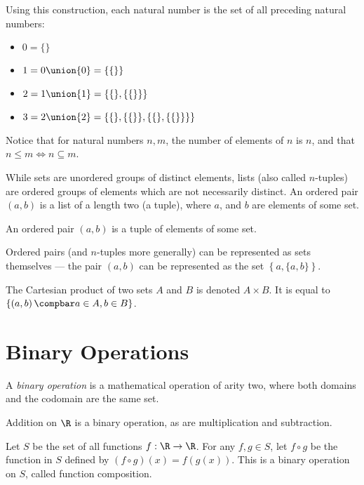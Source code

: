 \documentclass[12pt]{article}
\begin{document}
Using this construction, each natural number is the set of all preceding natural numbers:
\begin{itemize}
    \item $0 = \{\}$
    \item $1 = 0 \union \{0\} = \{\{\}\}$
    \item $2 = 1 \union \{1\} = \{\{\}, \{\{\}\}\}$
    \item $3 = 2 \union \{2\} = \{\{\}, \{\{\}\}, \{\{\}, \{\{\}\}\}\}$
\end{itemize}

Notice that for natural numbers $n, m$, the number of elements of $n$ is $n$, and that $n \leq m \iff n \subseteq m$.

While sets are unordered groups of distinct elements, lists (also called $n$-tuples) are ordered groups of elements which are not necessarily distinct. An ordered pair $(a, b)$ is a list of a length two (a tuple), where $a$, and $b$ are elements of some set.

\begin{defn}\label{tuple}
    An ordered pair $(a, b)$ is a tuple of elements of some set.
\end{defn}

Ordered pairs (and $n$-tuples more generally) can be represented as sets themselves --- the pair $(a, b)$ can be represented as the set $\left\{a, \{a, b\}\right\}$.

\begin{defn}\label{cartesian-product}
    The Cartesian product of two sets $A$ and $B$ is denoted $A \times B$. It is equal to $\left\{\left(a, b\right) \compbar a \in A, b \in B \right\}$.
\end{defn}

\section{Binary Operations}

\begin{defn}
    A \emph{binary operation} is a mathematical operation of arity two, where both domains and the codomain are the same set.
\end{defn}

\begin{exmp}
    Addition on $\R$ is a binary operation, as are multiplication and subtraction.
\end{exmp}

\begin{exmp}
    Let $S$ be the set of all functions $f : \R \to \R$. For any $f, g \in S$, let $f \circ g$ be the function in $S$ defined by $(f \circ g)(x) = f(g(x))$. This is a binary operation on $S$, called function composition.
\end{exmp}
\end{document}
